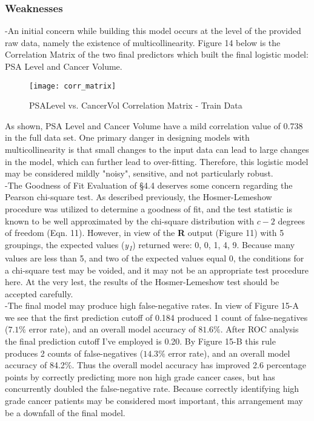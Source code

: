 \subsubsection{Weaknesses}
-An initial concern while building this model occurs at the level of the provided raw data, namely the existence of multicollinearity. Figure 14 below is the Correlation Matrix of the two final predictors which built the final logistic model: PSA Level and Cancer Volume.

\begin{figure}[H]
	\centering
	\texttt{[image: corr\_matrix]}
	\caption{PSALevel vs. CancerVol Correlation Matrix - Train Data}
\end{figure}

\pagebreak
As shown, PSA Level and Cancer Volume have a mild correlation value of 0.738 in the full data set. One primary danger in designing models with multicollinearity is that small changes to the input data can lead to large changes in the model, which can further lead to over-fitting. Therefore, this logistic model may be considered mildly "noisy", sensitive, and not particularly robust. \\

-The Goodness of Fit Evaluation of \S4.4 deserves some concern regarding the Pearson chi-square test. As described previously, the Hosmer-Lemeshow procedure was utilized to determine a goodness of fit, and the test statistic is known to be well approximated by the chi-square distribution with \(c-2\) degrees of freedom (Eqn. 11). However, in view of the \textbf{R} output (Figure 11) with 5 groupings, the expected values (\textit{y\textsubscript{1}}) returned were: 0, 0, 1, 4, 9. Because many values are less than 5, and two of the expected values equal 0, the conditions for a chi-square test may be voided, and it may not be an appropriate test procedure here. At the very lest, the results of the Hosmer-Lemeshow test should be accepted carefully. \\

-The final model may produce high false-negative rates. In view of Figure 15-A we see that the first prediction cutoff of 0.184 produced 1 count of false-negatives (\(7.1\%\) error rate), and an overall model accuracy of \(81.6\%\). After ROC analysis the final prediction cutoff I've employed is 0.20. By Figure 15-B this rule produces 2 counts of false-negatives (\(14.3\%\) error rate), and an overall model accuracy of 84.2\%. Thus the overall model accuracy has improved 2.6 percentage points by correctly predicting more non high grade cancer cases, but has concurrently doubled the false-negative rate. Because correctly identifying high grade cancer patients may be considered most important, this arrangement may be a downfall of the final model.

